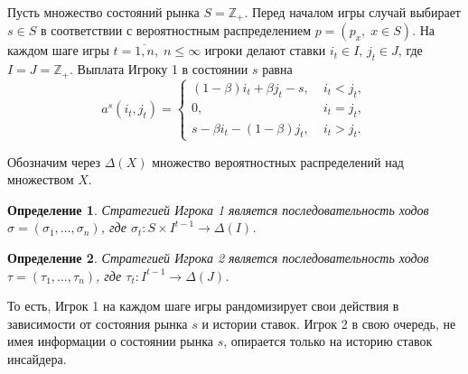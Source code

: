 \documentclass[12pt, draft]{extarticle}
\newtheorem{definition}{Определение}
\begin{document}
Пусть множество состояний рынка $S = \mathbb{Z}_+$. Перед началом игры случай
выбирает $s \in S$ в соответствии с вероятностным распределением $p = (p_x, \; x
\in S)$. На каждом шаге игры $t = \overline{1,n}, \; n \leqslant \infty$ игроки
делают ставки $i_t \in I, \, j_t \in J$, где $I = J = \mathbb{Z}_+$. Выплата
Игроку 1 в состоянии $s$ равна
\begin{equation*}
  a^s(i_t, j_t) =
  \begin{cases}
    (1-\beta) i_t + \beta j_t - s, &\; i_t < j_t, \\
    0, &\; i_t = j_t, \\
    s - \beta i_t - (1-\beta)j_t, &\; i_t > j_t.
  \end{cases}
\end{equation*}

Обозначим через $\Delta(X)$ множество вероятностных распределений над множеством
$X$.
\begin{definition}
  Стратегией Игрока 1 является последовательность ходов $\sigma = (\sigma_1,
  \ldots, \sigma_n)$, где $\sigma_t: S \times I^{t-1} \rightarrow \Delta(I)$.
\end{definition}

\begin{definition}
  Стратегией Игрока 2 является последовательность ходов $\tau = (\tau_1, \ldots,
  \tau_n)$, где $\tau_t: I^{t-1} \rightarrow \Delta(J)$.
\end{definition}

То есть, Игрок 1 на каждом шаге игры рандомизирует свои действия в зависимости
от состояния рынка $s$ и истории ставок. Игрок 2 в свою очередь, не имея
информации о состоянии рынка $s$, опирается только на историю ставок инсайдера.
\end{document}
